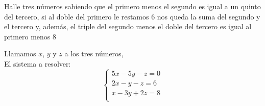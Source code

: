 \documentclass[spanish, 11pt]{exam}
\begin{document}
        \begin{questions}
        
\question Halle tres números sabiendo que el primero menos el segundo es igual a un quinto del tercero, 
si al doble del primero le restamos 6 nos queda la suma del segundo y el tercero y, además, 
el triple del segundo menos el doble del tercero es igual al primero menos 8
\begin{solution}
    Llamamos $x$, $y$ y $z$  a los tres números,\\
    El sistema a resolver: $$\left\{ \begin{matrix}5 x - 5 y - z = 0 \\ 2 x - y - z = 6 \\ x - 3 y + 2 z = 8 \\ \end{matrix}\right.$$

\end{solution}
\end{questions}
\end{document}
